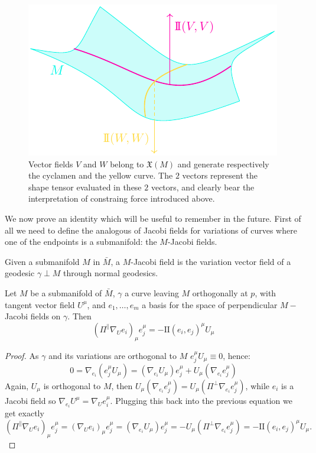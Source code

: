 \begin{figure}
	\caption[]{Vector fields \(V\) and \(W\) belong to \(\mathfrak{X}(M)\) and generate respectively the cyclamen and the yellow curve. The \(2\) vectors represent the shape tensor evaluated in these \(2\) vectors, and clearly bear the interpretation of constraing force introduced above.}
	\label{fig:shape-tensor}
	\centering
	\includegraphics[scale=1.7]{Immagini/shape-tensor/shape-tensor.pdf}
\end{figure}

We now prove an identity which will be useful to remember in the future. First of all we need to define the analogous of Jacobi fields for variations of curves where one of the endpoints is a submanifold: the \(M\)-Jacobi fields.
\begin{definition}
	Given a submanifold \(M\) in \(\bar{M}\), a \(M\)-Jacobi field is the variation vector field of a geodesic \(\gamma \perp M\) through normal geodesics.
\end{definition}
\begin{lemma}
	\label{lemma:shape-identity}
	Let \(M\) be a submanifold of \(\bar{M}\), \(\gamma\) a curve leaving \(M\) orthogonally at \(p\), with tangent vector field \(U^{\mu}\), and \(e_1, \ldots, e_m\) a basis for the space of perpendicular \(M-\)Jacobi fields on \(\gamma\).
	Then 
	\begin{equation}
		(\Pi^{\parallel}\nabla_Ue_i)_{\mu}e_j^{\mu} = - \mathrm{I\!I}(e_i, e_j)^{\mu}U_{\mu}
	\end{equation}
\end{lemma}

	\begin{proof}
		As \(\gamma\) and its variations are orthogonal to \(M\) \(e_j^{\mu}U_{\mu} \equiv 0\), hence:
		\[
		0 = \nabla_{e_i}\left(e_j^{\mu}U_{\mu}\right) = \left(\nabla_{e_i}U_{\mu}\right)e_j^{\mu} + U_{\mu}\left(\nabla_{e_i}e_j^{\mu}\right)
		\]
		Again, \(U_{\mu}\) is orthogonal to \(M\), then \(U_{\mu}  \left(\nabla_{e_i}e_j^{\mu}\right)= U_{\mu}\left(\Pi^{\perp}\nabla_{e_i}e_j^{\mu}\right)\), while \(e_i\) is a Jacobi field so \(\nabla_{e_i}U^{\mu} = \nabla_Ue_i^{\mu}\). Plugging this back into the previous equation we get exactly
		\[
		(\Pi^{\parallel}\nabla_Ue_i)_{\mu}e_j^{\mu} = (\nabla_Ue_i)_{\mu}e_j^{\mu} = (\nabla_{e_i}U_{\mu}) e_j^{\mu} = - U_{\mu}\left(\Pi^{\perp}\nabla_{e_i}e_j^{\mu}\right) = - \mathrm{I\!I}(e_i, e_j)^{\mu}U_{\mu}.
		\]
	\end{proof}


